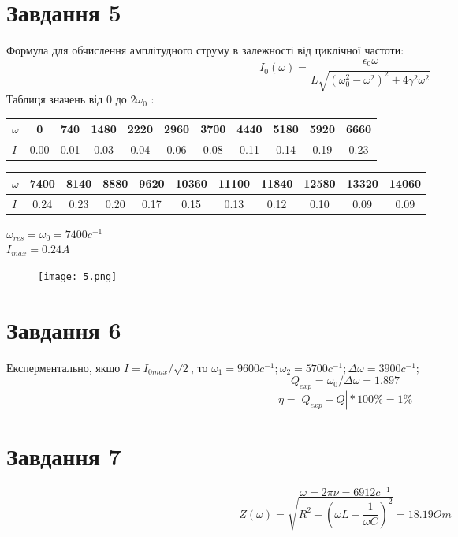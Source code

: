 \documentclass[a4paper,12pt]{article}
\begin{document}
\section*{Завдання 5}
\hspace*{\parindent}Формула для обчислення амплітудного струму в залежності від циклічної частоти:  \[ I_{0}(\omega) = \frac{\epsilon_{0}\omega}{L\sqrt{(\omega_{0}^2 - \omega^2)^2 + 4\gamma^2\omega^2}} \]
\hspace*{\parindent}Таблиця значень від 0 до \( 2\omega_0 \) : \newline
\vspace{0.1cm}
\newline
\begin{tabular}{| l | *{10}{ c |} }
  \hline
  \( \omega \) & 0 & 740 & 1480 & 2220 & 2960 & 3700 & 4440 & 5180 & 5920 & 6660\\
  \hline
  \( I \) & 0.00 & 0.01 & 0.03 & 0.04 & 0.06 & 0.08 & 0.11 & 0.14 & 0.19 & 0.23 \\
  \hline
\end{tabular}
\newline
\vspace{0.5cm}
\newline
\begin{tabular}{| l | *{10}{ c |} }
  \hline
  \( \omega \) & 7400 & 8140 & 8880 & 9620 & 10360 & 11100 & 11840 & 12580 & 13320 & 14060\\
  \hline
  \( I \) & 0.24 & 0.23 & 0.20 & 0.17 & 0.15 & 0.13 & 0.12 & 0.10 & 0.09 & 0.09 \\
\hline
\end{tabular}
\newline
\vspace{0.5cm}
\newline
\( \omega_{res} = \omega_0 = 7400 c^{-1} \) \\
\( I_{max} = 0.24 A \)
\begin{figure}[!h]
\texttt{[image: 5.png]}
\end{figure}
\section*{Завдання 6}
\hspace*{\parindent}Експерментально, якщо \( I = I_{0max}/\sqrt{2}\), то \( \omega_1=9600c^{-1}; \omega_2=5700c^{-1}; \Delta \omega = 3900c^{-1}; \)
\[ Q_{exp} = \omega_0 / \Delta \omega = 1.897 \]
\[ \eta = | Q_{exp} - Q |*100\% =1\% \]
\section*{Завдання 7}
\[\omega = 2 \pi \nu = 6912c^{-1} \]
\[ Z(\omega) = \sqrt{R^2 + (\omega L - \dfrac{1}{\omega C})^2} = 18.19 Om \]
\hspace*{\parindent}
\end{document}
